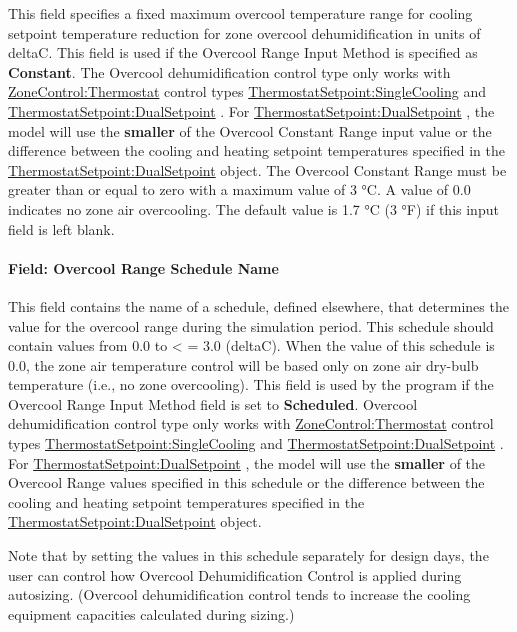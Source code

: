 This field specifies a fixed maximum overcool temperature range for cooling setpoint temperature reduction for zone overcool dehumidification in units of deltaC. This field is used if the Overcool Range Input Method is specified as \textbf{Constant}. The Overcool dehumidification control type only works with \hyperref[zonecontrolthermostat]{ZoneControl:Thermostat} control types \hyperref[thermostatsetpointsinglecooling]{ThermostatSetpoint:SingleCooling} and \hyperref[thermostatsetpointdualsetpoint]{ThermostatSetpoint:DualSetpoint} . For \hyperref[thermostatsetpointdualsetpoint]{ThermostatSetpoint:DualSetpoint} , the model will use the \textbf{smaller} of the Overcool Constant Range input value or the difference between the cooling and heating setpoint temperatures specified in the \hyperref[thermostatsetpointdualsetpoint]{ThermostatSetpoint:DualSetpoint} object. The Overcool Constant Range must be greater than or equal to zero with a maximum value of 3 °C. A value of 0.0 indicates no zone air overcooling. The default value is 1.7 °C (3 °F) if this input field is left blank.

\paragraph{Field: Overcool Range Schedule Name}\label{field-overcool-range-schedule-name}

This field contains the name of a schedule, defined elsewhere, that determines the value for the overcool range during the simulation period. This schedule should contain values from 0.0 to \textless{} = 3.0 (deltaC). When the value of this schedule is 0.0, the zone air temperature control will be based only on zone air dry-bulb temperature (i.e., no zone overcooling). This field is used by the program if the Overcool Range Input Method field is set to \textbf{Scheduled}. Overcool dehumidification control type only works with \hyperref[zonecontrolthermostat]{ZoneControl:Thermostat} control types \hyperref[thermostatsetpointsinglecooling]{ThermostatSetpoint:SingleCooling} and \hyperref[thermostatsetpointdualsetpoint]{ThermostatSetpoint:DualSetpoint} . For \hyperref[thermostatsetpointdualsetpoint]{ThermostatSetpoint:DualSetpoint} , the model will use the \textbf{smaller} of the Overcool Range values specified in this schedule or the difference between the cooling and heating setpoint temperatures specified in the \hyperref[thermostatsetpointdualsetpoint]{ThermostatSetpoint:DualSetpoint} object.

Note that by setting the values in this schedule separately for design days, the user can control how Overcool Dehumidification Control is applied during autosizing. (Overcool dehumidification control tends to increase the cooling equipment capacities calculated during sizing.)

